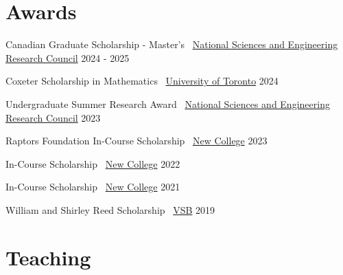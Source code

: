 \documentclass[]{style}
\begin{document}
\section{Awards}

\begin{entrylist}

\vspace{-3mm}
\entry
{Canadian Graduate Scholarship - Master's \ {\normalfont \underline{National Sciences and Engineering Research Council}}}
{2024 - 2025}
{}

\vspace{-3mm}
\entry
{Coxeter Scholarship in Mathematics \ {\normalfont \underline{University of Toronto}}}
{2024}
{}

\vspace{-3mm}
\entry
{Undergraduate Summer Research Award \ {\normalfont \underline{National Sciences and Engineering Research Council}}}
{2023}
{}

\vspace{-3mm}
\entry
{Raptors Foundation In-Course Scholarship \ {\normalfont \underline{New College}}}
{2023}
{}

\vspace{-3mm}
\entry
{In-Course Scholarship \ {\normalfont \underline{New College}}}
{2022}
{}

\vspace{-3mm}
\entry
{In-Course Scholarship \ {\normalfont \underline{New College}}}
{2021}
{}

\vspace{-3mm}
\entry
{William and Shirley Reed Scholarship \ {\normalfont \underline{VSB}}}
{2019}
{}

\end{entrylist}

\section{Teaching}
\end{document}
